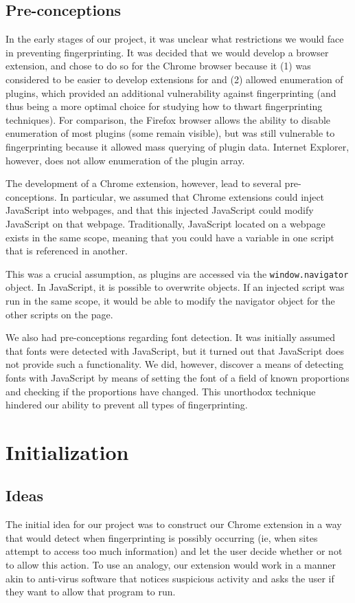 \documentclass[12pt,a4paper]{article}
\begin{document}
\subsection{Pre-conceptions}
In the early stages of our project, it was unclear what restrictions we would face in preventing fingerprinting. It was decided that we would develop a browser extension, and chose to do so for the Chrome browser because it (1) was considered to be easier to develop extensions for and (2) allowed enumeration of plugins, which provided an additional vulnerability against fingerprinting (and thus being a more optimal choice for studying how to thwart fingerprinting techniques). For comparison, the Firefox browser allows the ability to disable enumeration of most plugins (some remain visible), but was still vulnerable to fingerprinting because it allowed mass querying of plugin data. Internet Explorer, however, does not allow enumeration of the plugin array.

The development of a Chrome extension, however, lead to several pre-conceptions. In particular, we assumed that Chrome extensions could inject JavaScript into webpages, and that this injected JavaScript could modify JavaScript on that webpage. Traditionally, JavaScript located on a webpage exists in the same scope, meaning that you could have a variable in one script that is referenced in another.

This was a crucial assumption, as plugins are accessed via the \texttt{window.navigator} object. In JavaScript, it is possible to overwrite objects. If an injected script was run in the same scope, it would be able to modify the navigator object for the other scripts on the page.

We also had pre-conceptions regarding font detection. It was initially assumed that fonts were detected with JavaScript, but it turned out that JavaScript does not provide such a functionality. We did, however, discover a means of detecting fonts with JavaScript by means of setting the font of a field of known proportions and checking if the proportions have changed. This unorthodox technique hindered our ability to prevent all types of fingerprinting.

\section{Initialization}

\subsection{Ideas}
The initial idea for our project was to construct our Chrome extension in a way that would detect when fingerprinting is possibly occurring (ie, when sites attempt to access too much information) and let the user decide whether or not to allow this action. To use an analogy, our extension would work in a manner akin to anti-virus software that notices suspicious activity and asks the user if they want to allow that program to run.
\end{document}
